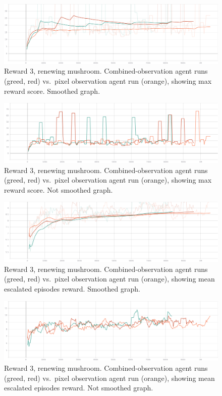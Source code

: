 \documentclass[]{article}
\begin{document}
\begin{figure}
\centering
\includegraphics{./img/114088967-e4334580-98b5-11eb-9ba0-958450ed4f54.png}
\caption{Reward 3, renewing mushroom. Combined-observation agent runs
(greed, red) vs.~pixel observation agent run (orange), showing max
reward score. Smoothed graph.}
\end{figure}

\begin{figure}
\centering
\includegraphics{./img/114088996-edbcad80-98b5-11eb-8ac5-273586752b65.png}
\caption{Reward 3, renewing mushroom. Combined-observation agent runs
(greed, red) vs.~pixel observation agent run (orange), showing max
reward score. Not smoothed graph.}
\end{figure}

\begin{figure}
\centering
\includegraphics{./img/114089048-fd3bf680-98b5-11eb-868b-8b4eb53b3287.png}
\caption{Reward 3, renewing mushroom. Combined-observation agent runs
(greed, red) vs.~pixel observation agent run (orange), showing mean
escalated episodes reward. Smoothed graph.}
\end{figure}

\begin{figure}
\centering
\includegraphics{./img/114089086-06c55e80-98b6-11eb-8bcd-c67011250e6e.png}
\caption{Reward 3, renewing mushroom. Combined-observation agent runs
(greed, red) vs.~pixel observation agent run (orange), showing mean
escalated episodes reward. Not smoothed graph.}
\end{figure}
\end{document}
